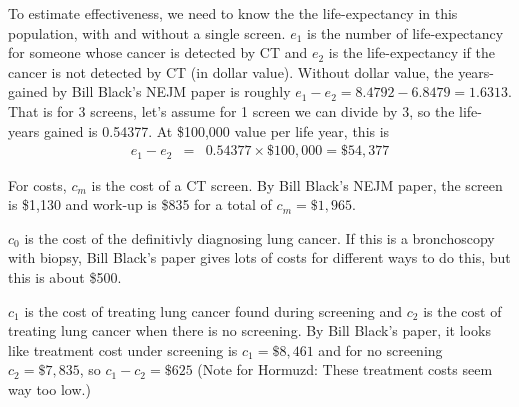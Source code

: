 \documentclass[11pt]{article}
\begin{document}
To estimate effectiveness, we need to know the the life-expectancy in this population, with and without a single screen.  $e_1$ is the number of life-expectancy for someone whose cancer is detected by CT and $e_2$ is the life-expectancy if the cancer is not detected by CT (in dollar value). Without dollar value, the years-gained by Bill Black's NEJM paper is roughly $e_1-e_2=8.4792-6.8479=1.6313$.  That is for 3 screens, let's assume for 1 screen we can divide by 3, so the life-years gained is 0.54377.  At \$100,000 value per life year, this is
\begin{eqnarray*}
e_1-e_2 &=& 0.54377\times\$100,000 = \$54,377
\end{eqnarray*}


For costs, $c_m$ is the cost of a CT screen.  By Bill Black's NEJM paper, the screen is \$1,130 and work-up is \$835 for a total of $c_m=\$1,965$.

$c_0$ is the cost of the definitivly diagnosing lung cancer.  If this is a bronchoscopy with biopsy, Bill Black's paper gives lots of costs for different ways to do this, but this is about \$500.

$c_1$ is the cost of treating lung cancer found during screening and $c_2$ is the cost of treating lung cancer when there is no screening.  By Bill Black's paper, it looks like treatment cost under screening is $c_1=\$8,461$ and for no screening $c_2=\$7,835$, so $c_1-c_2=\$625$  (Note for Hormuzd: These treatment costs seem way too low.)

\end{document}
